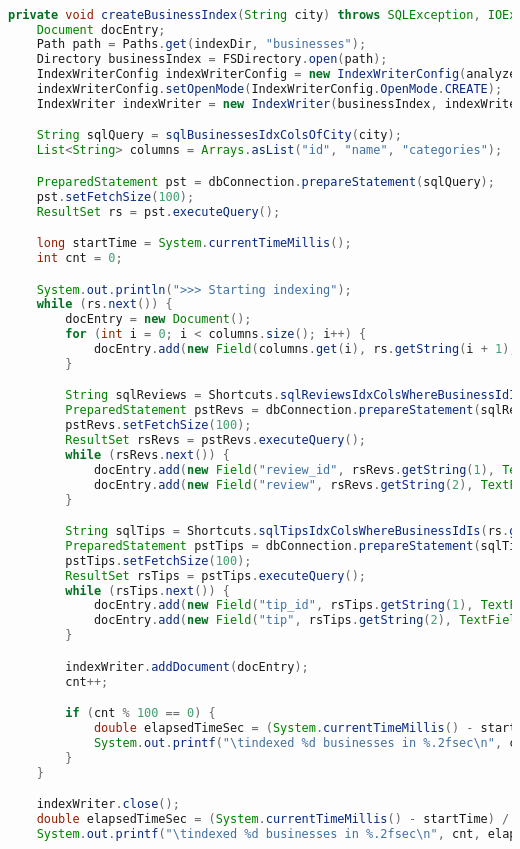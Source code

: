 \begin{lstlisting}[language=Java]

private void createBusinessIndex(String city) throws SQLException, IOException {
    Document docEntry;
    Path path = Paths.get(indexDir, "businesses");
    Directory businessIndex = FSDirectory.open(path);
    IndexWriterConfig indexWriterConfig = new IndexWriterConfig(analyzer);
    indexWriterConfig.setOpenMode(IndexWriterConfig.OpenMode.CREATE);
    IndexWriter indexWriter = new IndexWriter(businessIndex, indexWriterConfig);

    String sqlQuery = sqlBusinessesIdxColsOfCity(city);
    List<String> columns = Arrays.asList("id", "name", "categories");

    PreparedStatement pst = dbConnection.prepareStatement(sqlQuery);
    pst.setFetchSize(100);
    ResultSet rs = pst.executeQuery();

    long startTime = System.currentTimeMillis();
    int cnt = 0;

    System.out.println(">>> Starting indexing");
    while (rs.next()) {
        docEntry = new Document();
        for (int i = 0; i < columns.size(); i++) {
            docEntry.add(new Field(columns.get(i), rs.getString(i + 1), TextField.TYPE_STORED));
        }

        String sqlReviews = Shortcuts.sqlReviewsIdxColsWhereBusinessIdIs(rs.getString(1));
        PreparedStatement pstRevs = dbConnection.prepareStatement(sqlReviews);
        pstRevs.setFetchSize(100);
        ResultSet rsRevs = pstRevs.executeQuery();
        while (rsRevs.next()) {
            docEntry.add(new Field("review_id", rsRevs.getString(1), TextField.TYPE_STORED));
            docEntry.add(new Field("review", rsRevs.getString(2), TextField.TYPE_STORED));
        }

        String sqlTips = Shortcuts.sqlTipsIdxColsWhereBusinessIdIs(rs.getString(1));
        PreparedStatement pstTips = dbConnection.prepareStatement(sqlTips);
        pstTips.setFetchSize(100);
        ResultSet rsTips = pstTips.executeQuery();
        while (rsTips.next()) {
            docEntry.add(new Field("tip_id", rsTips.getString(1), TextField.TYPE_STORED));
            docEntry.add(new Field("tip", rsTips.getString(2), TextField.TYPE_STORED));
        }

        indexWriter.addDocument(docEntry);
        cnt++;

        if (cnt % 100 == 0) {
            double elapsedTimeSec = (System.currentTimeMillis() - startTime) / 1000.0;
            System.out.printf("\tindexed %d businesses in %.2fsec\n", cnt, elapsedTimeSec);
        }
    }

    indexWriter.close();
    double elapsedTimeSec = (System.currentTimeMillis() - startTime) / 1000.0;
    System.out.printf("\tindexed %d businesses in %.2fsec\n", cnt, elapsedTimeSec);

\end{lstlisting}

